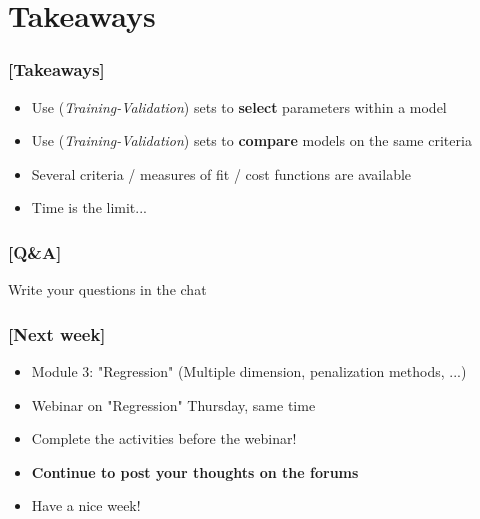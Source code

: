 \documentclass[xcolor=x11names,compress, aspectratio=169]{beamer}
\renewcommand{\(}{\begin{columns}}
\renewcommand{\)}{\end{columns}}
\newcommand{\<}[1]{\begin{column}{#1}}
\renewcommand{\>}{\end{column}}
\begin{document}
\section{Takeaways}

\begin{frame} %
\frametitle{\textcolor{brique}{[Takeaways]}}
\begin{itemize}[<+->]
  \item Use (\textit{Training-Validation}) sets to \textbf{select} parameters within a model
  \item Use (\textit{Training-Validation}) sets to \textbf{compare} models on the same criteria
  \item Several criteria / measures of fit / cost functions are available
  \item Time is the limit...
\end{itemize}
\end{frame}


\begin{frame} %
\frametitle{\textcolor{brique}{[Q\&A]}}
\begin{center}
\Large \textcolor{siap}{ Write your questions in the chat}
\end{center}
\end{frame}

\begin{frame} %
\frametitle{\textcolor{brique}{[Next week]}}
\pause
\begin{itemize}[<+->]
    \item Module 3: "Regression" (Multiple dimension, penalization methods, ...)
    \item Webinar on "Regression" Thursday, same time
    \item Complete the activities before the webinar!
    \item \textbf{Continue to post your thoughts on the forums}
    \item[] \begin{center}
                \Large \textcolor{siap}{ Have a nice week!}
            \end{center}
\end{itemize}
\end{frame}
\end{document}
